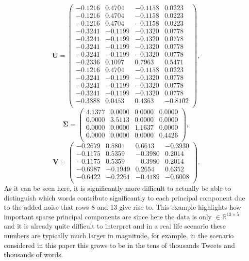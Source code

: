 \documentclass[11pt,a4paper]{article}
\begin{document}
\begin{equation*}
\mathbf{U}=
\begin{pmatrix}
-0.1216&0.4704&-0.1158&0.0223\\
-0.1216&0.4704&-0.1158&0.0223\\
-0.1216&0.4704&-0.1158&0.0223\\
-0.3241&-0.1199&-0.1320&0.0778\\
-0.3241&-0.1199&-0.1320&0.0778\\
-0.3241&-0.1199&-0.1320&0.0778\\
-0.3241&-0.1199&-0.1320&0.0778\\
-0.2336&0.1097&0.7963&0.5471\\
-0.1216&0.4704&-0.1158&0.0223\\
-0.3241&-0.1199&-0.1320&0.0778\\
-0.3241&-0.1199&-0.1320&0.0778\\
-0.3241&-0.1199&-0.1320&0.0778\\
-0.3888&0.0453&0.4363&-0.8102\\
\end{pmatrix},
\end{equation*}
\begin{equation*}
\mathbf{\Sigma}=
\begin{pmatrix}
4.1377&0.0000&0.0000&0.0000\\
0.0000&3.5113&0.0000&0.0000\\
0.0000&0.0000&1.1637&0.0000\\
0.0000&0.0000&0.0000&0.4426\\
\end{pmatrix},
\end{equation*}
\begin{equation*}
\mathbf{V}=
\begin{pmatrix}
-0.2679&0.5801&0.6613&-0.3930\\
-0.1175&0.5359&-0.3980&0.2014\\
-0.1175&0.5359&-0.3980&0.2014\\
-0.6987&-0.1949&0.2654&0.6352\\
-0.6422&-0.2261&-0.4189&-0.6008\\
\end{pmatrix}.
\end{equation*}
As it can be seen here, it is significantly more difficult to actually be able to distinguish which words contribute significantly to each principal component due to the added noise that rows 8 and 13 give rise to. This example highlights how important sparse principal components are since here the data is only $\in \mathbb{R}^{13 \times 5}$ and it is already quite difficult to interpret and in a real life scenario these numbers are typically much larger in magnitude, for example, in the scenario considered in this paper this grows to be in the tens of thousands Tweets and thousands of words.
\end{document}
